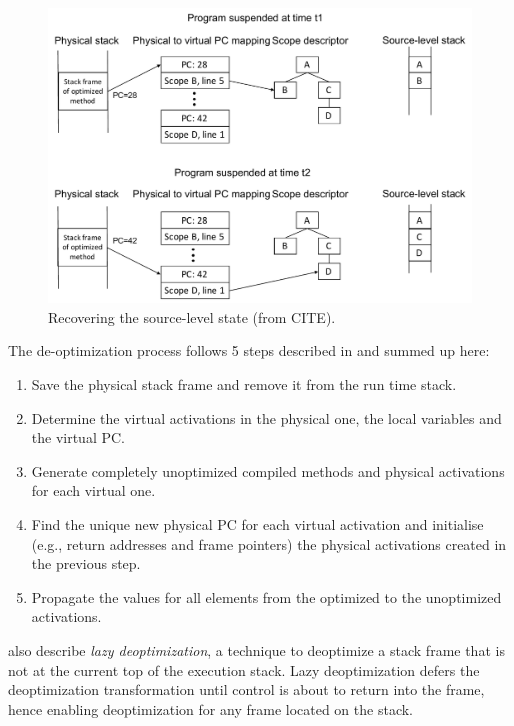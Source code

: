 \begin{figure}[h]
\centering
\includegraphics[scale=0.5]{Figures/Figure2}
\decoRule
\caption[Recovering the source-level state]{Recovering the source-level state (from CITE).}
\label{Holzle2}
\end{figure}


The de-optimization process follows 5 steps described in \cite{holzle1992debugging} and summed up here:
\begin{enumerate}
    \item Save the physical stack frame and remove it from the run time stack.
    \item Determine the virtual activations in the physical one, the local variables and the virtual PC.
    \item Generate completely unoptimized compiled methods and physical activations for each virtual one.
    \item Find the unique new physical PC for each virtual activation and initialise (e.g., return addresses and frame pointers) the physical activations created in the previous step.
    \item Propagate the values for all elements from the optimized to the unoptimized activations.
\end{enumerate}

 also describe \textit{lazy deoptimization}, a technique to deoptimize a stack frame that is not at the current top of the execution stack. 
Lazy deoptimization defers the deoptimization transformation until control is about to return into the frame, hence enabling deoptimization for any frame located on the stack.\\

